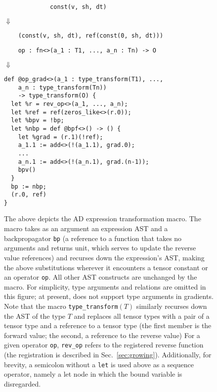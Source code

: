 \begin{figure}
  \begin{verbatim}
             const(v, sh, dt)
  \end{verbatim}
  $\Downarrow$
  \begin{verbatim}
    (const(v, sh, dt), ref(const(0, sh, dt)))
  \end{verbatim}

  \begin{verbatim}
    op : fn<>(a_1 : T1, ..., a_n : Tn) -> O
  \end{verbatim}
  $\Downarrow$
  \begin{verbatim}
def @op_grad<>(a_1 : type_transform(T1), ...,
    a_n : type_transform(Tn))
    -> type_transform(O) {
  let %r = rev_op<>(a_1, ..., a_n);
  let %ref = ref(zeros_like<>(r.0));
  let %bpv = !bp;
  let %nbp = def @bpf<>() -> () {
    let %grad = (r.1)(!ref);
    a_1.1 := add<>(!(a_1.1), grad.0);
    ...
    a_n.1 := add<>(!(a_n.1), grad.(n-1));
    bpv()
  }
  bp := nbp;
  (r.0, ref)
}
  \end{verbatim}
  \caption{
    The above depicts the AD expression
      transformation macro.
    The macro takes as an
      argument an expression AST and a backpropagator
      \texttt{bp}
      (a reference to a function that takes no
      arguments and returns unit,
      which serves to update the reverse value references)
      and recurses down the expression's AST,
      making the above substitutions wherever
      it encounters a tensor constant or an operator
      \texttt{op}.
    All other AST constructs are unchanged by the macro.
    For simplicity, type arguments and relations
      are omitted in this figure;
      at present, \relay does not
      support type arguments in gradients.
    Note that the macro \texttt{type\_transform}$(T)$
      similarly recurses down the AST of the type $T$
      and replaces all tensor types with a
      pair of a tensor type
      and a reference to a tensor type
      (the first member is the forward value;
      the second, a reference to the reverse value)
    For a given operator \texttt{op},
      \texttt{rev\_op} refers to the registered reverse function
      (the registration is described in Sec.~\ref{sec:growing}).
    Additionally, for brevity,
      a semicolon without a \texttt{let}
      is used above as a sequence operator,
      namely a let node in which the bound
      variable is disregarded.}
  \label{fig:ad-expr-transform}
\end{figure}

